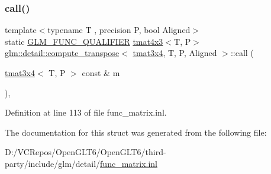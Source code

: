 \subsubsection{\texorpdfstring{call()}{call()}}
{\footnotesize\ttfamily template$<$typename T , precision P, bool Aligned$>$ \\
static \mbox{\hyperlink{setup_8hpp_a33fdea6f91c5f834105f7415e2a64407}{G\+L\+M\+\_\+\+F\+U\+N\+C\+\_\+\+Q\+U\+A\+L\+I\+F\+I\+ER}} \mbox{\hyperlink{structglm_1_1tmat4x3}{tmat4x3}}$<$T, P$>$ \mbox{\hyperlink{structglm_1_1detail_1_1compute__transpose}{glm\+::detail\+::compute\+\_\+transpose}}$<$ \mbox{\hyperlink{structglm_1_1tmat3x4}{tmat3x4}}, T, P, Aligned $>$\+::call (\begin{DoxyParamCaption}\item[{\mbox{\hyperlink{structglm_1_1tmat3x4}{tmat3x4}}$<$ T, P $>$ const \&}]{m }\end{DoxyParamCaption})\hspace{0.3cm}{\ttfamily [inline]}, {\ttfamily [static]}}



Definition at line 113 of file func\+\_\+matrix.\+inl.



The documentation for this struct was generated from the following file\+:\begin{DoxyCompactItemize}
\item 
D\+:/\+V\+C\+Repos/\+Open\+G\+L\+T6/\+Open\+G\+L\+T6/third-\/party/include/glm/detail/\mbox{\hyperlink{func__matrix_8inl}{func\+\_\+matrix.\+inl}}\end{DoxyCompactItemize}
